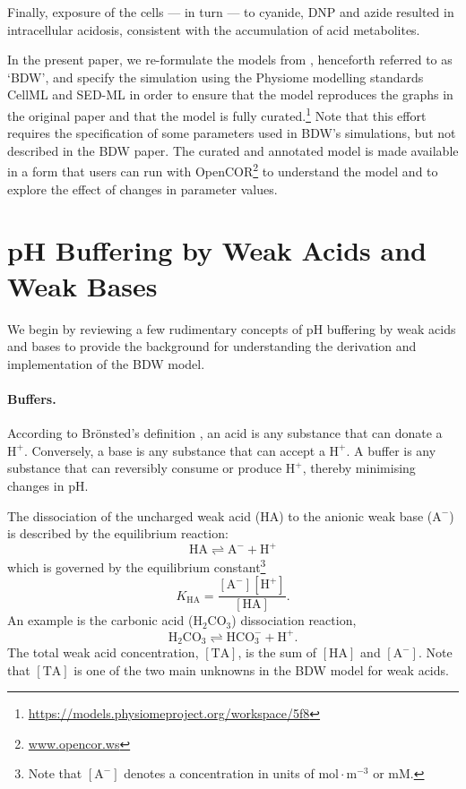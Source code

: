 \documentclass[fleqn,10pt]{physiome}
\begin{document}
\begin{figure}[ht]
\end{figure}

Finally, exposure of the cells --- in turn --- to cyanide, DNP and azide resulted in intracellular acidosis, consistent with the accumulation of acid metabolites.

In the present paper, we re-formulate the models from \cite{boron1976intracellular}, henceforth referred to as `BDW', and specify the simulation using the Physiome modelling standards CellML \citep{cuellar2003overview} and SED-ML \citep{bergmann2017sed} in order to ensure that the model reproduces the graphs in the original paper and that the model is fully curated.\footnote{\url{https://models.physiomeproject.org/workspace/5f8}} Note that this effort requires the specification of some parameters used in BDW's simulations, but not described in the BDW paper. The curated and annotated model is made available in a form that users can run with OpenCOR\footnote{\url{www.opencor.ws}} to understand the model and to explore the effect of changes in parameter values.

\section{pH Buffering by Weak Acids and Weak Bases}

We begin by reviewing a few rudimentary concepts of $\mathrm{pH}$ buffering by weak acids and bases \citep{roos1981intracellular,bevensee2013control,boron2016medical} to provide the background for understanding the derivation and implementation of the BDW model.

\paragraph{Buffers.}

According to Br\"{o}nsted's definition \citep{bronsted1923einige}, an acid is any substance that can donate a $\mathrm{H^+}$. Conversely, a base is any substance that can accept a $\mathrm{H^+}$. A buffer is any substance that can reversibly consume or produce $\mathrm{H^+}$, thereby minimising changes in $\mathrm{pH}$.

The dissociation of the uncharged weak acid ($\mathrm{HA}$) to the anionic weak base ($\mathrm{A^-}$) is described by the equilibrium reaction:
\begin{equation}
\mathrm{HA \rightleftharpoons A^- + H^+}
\end{equation}
which is governed by the equilibrium constant\footnote{Note that $\mathrm{[A^-]}$ denotes a concentration in units of $\mathrm{mol\cdot m^{-3}}$ or $\mathrm{mM}$.}
\begin{equation}
K_\mathrm{HA}=\dfrac{\mathrm{[A^-][H^+]}}{\mathrm{[HA]}}.
\label{eqn:K_A}
\end{equation}
An example is the carbonic acid ($\mathrm{H_2CO_3}$) dissociation reaction,
\begin{equation*}
\mathrm{H_2CO_3 \rightleftharpoons HCO_3^- + H^+}.
\end{equation*}
The total weak acid concentration, $\mathrm{[TA]}$, is the sum of $\mathrm{[HA]}$ and $\mathrm{[A^-]}$. Note that $\mathrm{[TA]}$ is one of the two main unknowns in the BDW model for weak acids.
\end{document}
